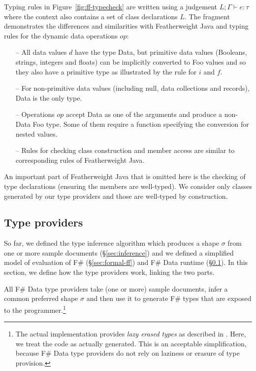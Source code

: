 \documentclass[10pt]{sigplanconf}
\newcommand{\kvd}[1]{\textnormal{\textcolor{kvdclr}{\sffamily #1}}}
\newcommand{\ident}[1]{\textnormal{\sffamily #1}}
\begin{document}
Typing rules in Figure~\ref{fig:ff-typecheck} are written using a judgement
$L; \Gamma \vdash e : \tau$ where the context also contains a set of class declarations $L$.
The fragment demonstrates the differences and similarities with Featherweight Java \cite{fwjava} and
typing rules for the dynamic data operations $op$:
%
\begin{itemize}
\item[--] All data values $d$ have the type \ident{Data}, but primitive data values (Booleans, 
  strings, integers and floats) can be implicitly converted to Foo values and so they also have a 
  primitive type as illustrated by the rule for $i$ and $f$.
  
\item[--] For non-primitive data values (including \kvd{null}, data collections and records),
  \ident{Data} is the only type.
  
\item[--] Operations $op$ accept \ident{Data} as one of the arguments and produce a non-\ident{Data} 
  Foo type. Some of them require a function specifying the conversion for nested values.
  
\item[--] Rules for checking class construction and member access are similar to corresponding
  rules of Featherweight Java.  
\end{itemize}
%
An important part of Featherweight Java that is omitted here is the checking of type declarations
(ensuring the members are well-typed). We consider only classes generated by our type providers 
and those are well-typed by construction.


\subsection{Type providers}
\label{sec:formal-tp}

So far, we defined the type inference algorithm which produces a shape $\sigma$ from one 
or more sample documents (\S\ref{sec:inference}) and we defined a simplified model of evaluation
of F\# (\S\ref{sec:formal-ff}) and F\# Data runtime (\S\ref{sec:formal-tp}). In this section, we 
define how the type providers work, linking the two parts.

All F\# Data type providers take (one or more) sample documents, infer a common preferred shape $\sigma$
and then use it to generate F\# types that are exposed to the programmer.\footnote{The actual 
implementation provides \emph{lazy erased types} as described in \cite{fsharp-typeprov}. Here, we treat 
the code as actually generated. This is an acceptable simplification, because F\# Data type providers 
do not rely on laziness or erasure of type provision.}
\end{document}
